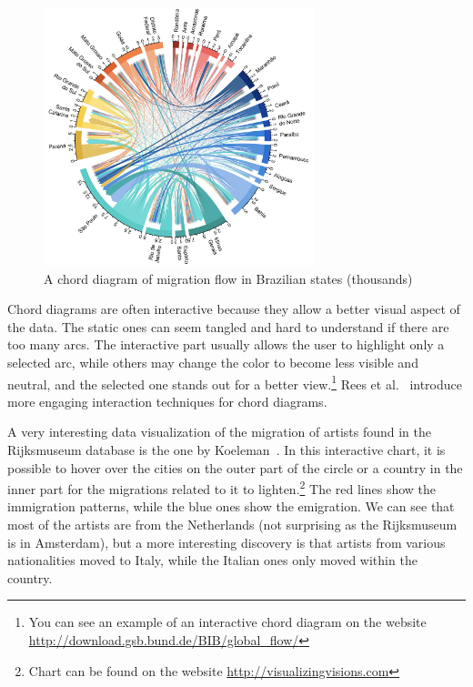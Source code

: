 \begin{figure}[h]
    \begin{center}
        \includegraphics[width=0.7\textwidth]{graphics/2-literature-review/15}
    \end{center}
    \caption{A chord diagram of migration flow in Brazilian states (thousands)}
    \label{fig:figure2.15}
\end{figure}

Chord diagrams are often interactive because they allow a better visual aspect of the data. The static ones can seem tangled and hard to
understand if there are too many arcs. The interactive part usually allows the user to highlight only a selected arc, while others may change
the color to become less visible and neutral, and the selected one stands out for a better view.\footnote{You can see an example of an
interactive chord diagram on the website\\ \url{http://download.gsb.bund.de/BIB/global_flow/}}
Rees et al.~\citep{rees2020interaction} introduce more engaging interaction techniques for chord diagrams.

A very interesting data visualization of the migration of artists found in the Rijksmuseum database is the one by
Koeleman~\citep{koeleman2017visualizing}. In this interactive chart, it is possible to hover over the cities on the outer part of the circle
or a country in the inner part for the migrations related to it to lighten.\footnote{Chart can be found on the website
\url{http://visualizingvisions.com}} The red lines show the immigration patterns, while the blue ones show the emigration. We can see that most
of the artists are from the Netherlands (not surprising as the Rijksmuseum is in Amsterdam), but a more interesting discovery is that artists
from various nationalities moved to Italy, while the Italian ones only moved within the country.

